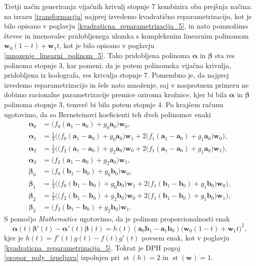 \documentclass[12pt,a4paper,twoside]{article}
\theoremstyle{definition} %
\theoremstyle{plain} %
\theoremstyle{primerstyle}
\numberwithin{equation}{section}  %
\newcommand{\aV}{\mathbf{a}}
\newcommand{\bV}{\mathbf{b}}
\newcommand{\wV}{\mathbf{w}}
\newcommand{\balpha}{\boldsymbol \alpha}
\newcommand{\bbeta}{\boldsymbol \beta}
\DeclareMathOperator{\st}{st}
\begin{document}
Tretji način generiranja vijačnih krivulj stopnje 7 kombinira oba prejšnja načina: na izrazu \eqref{transformacija} najprej izvedemo kvadratično reparametrizacijo, kot je bilo opisano v poglavju \ref{kvadraticna_reparametrizacija_5}, in nato pomnožimo števec in imenovalec pridobljenega ulomka s kompleksnim linearnim polinomom $\wV_0(1-t)+\wV_1t$, kot je bilo opisano v poglavju \ref{mnozenje_linearni_polinom_5}. Tako pridobljena polinoma $\balpha$ in $\bbeta$ sta res polinoma stopnje 3, kar pomeni, da je potem polinomska vijačna krivulja, pridobljena iz hodografa, res krivulja stopnje 7. Pomembno je, da najprej izvedemo reparametrizacijo in šele nato množenje, saj v nasprotnem primeru ne dobimo racionalne parametrizacije premice oziroma krožnice, kjer bi bila $\balpha$ in $\bbeta$ polinoma stopnje 3, temveč bi bila potem stopnje 4. Po krajšem računu ugotovimo, da so Bernsteinovi koeficienti teh dveh polinomov enaki
\begin{align}
	\balpha_0&=\big(f_0(\aV_1-\aV_0)+g_0\aV_0\big)\wV_0,\nonumber\\
	\balpha_1&=\frac{1}{3}\Big(\big(f_0(\aV_1-\aV_0)+g_0\aV_0\big)\wV_1+2\big(f_1(\aV_1-\aV_0)+g_1\aV_0\big)\wV_0\Big),\nonumber\\
	\balpha_2&=\frac{1}{3}\Big(\big(f_2(\aV_1-\aV_0)+g_2\aV_0\big)\wV_0+2\big(f_1(\aV_1-\aV_0)+g_1\aV_0\big)\wV_1\Big),\nonumber\\
	\balpha_3&=\big(f_2(\aV_1-\aV_0)+g_2\aV_0\big)\wV_1,\label{mnozenje_repara_7_koef}\\
	\bbeta_0&=\big(f_0(\bV_1-\bV_0)+g_0\bV_0\big)\wV_0,\nonumber\\
	\bbeta_1&=\frac{1}{3}\Big(\big(f_0(\bV_1-\bV_0)+g_0\bV_0\big)\wV_1+2\big(f_1(\bV_1-\bV_0)+g_1\bV_0\big)\wV_0\Big),\nonumber\\
	\bbeta_2&=\frac{1}{3}\Big(\big(f_2(\bV_1-\bV_0)+g_2\bV_0\big)\wV_0+2\big(f_1(\bV_1-\bV_0)+g_1\bV_0\big)\wV_1\Big),\nonumber\\
	\bbeta_3&=\big(f_2(\bV_1-\bV_0)+g_2\bV_0\big)\wV_1.\nonumber
\end{align}
S pomočjo \emph{Mathematice} ugotovimo, da je polinom proporcionalnosti enak
\begin{equation*}
	\balpha(t)\bbeta'(t)-\balpha'(t)\bbeta(t)=h(t)(\aV_0\bV_1-\aV_1\bV_0)\big(\wV_0(1-t)+\wV_1t\big)^2,
\end{equation*}
kjer je $h(t)=f'(t)g(t)-f(t)g'(t)$ povsem enak, kot v poglavju \ref{kvadraticna_reparametrizacija_5}. Tokrat je DPH pogoj \eqref{propor_poly_izpeljava} izpolnjen pri $\st(h)=2$ in $\st(\wV)=1.$
\end{document}
